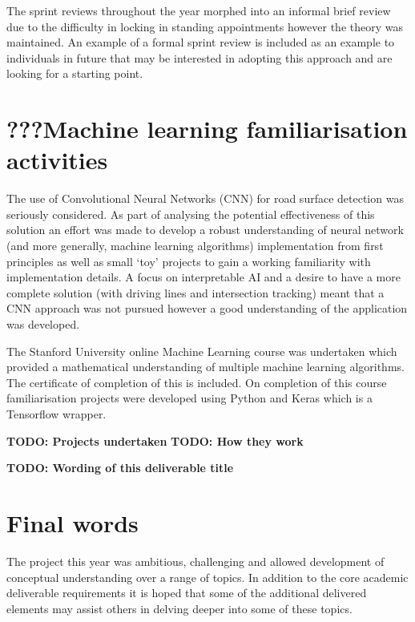 \documentclass{article}
\begin{document}
The sprint reviews throughout the year morphed into an informal brief review due to the difficulty in locking in standing appointments however the theory was maintained. An example of a formal sprint review is included as an example to individuals in future that may be interested in adopting this approach and are looking for a starting point.

\section{???Machine learning familiarisation activities}

The use of Convolutional Neural Networks (CNN) for road surface detection was seriously considered. As part of analysing the potential effectiveness of this solution an effort was made to develop a robust understanding of neural network (and more generally, machine learning algorithms) implementation from first principles as well as small `toy' projects to gain a working familiarity with implementation details. A focus on interpretable AI and a desire to have a more complete solution (with driving lines and intersection tracking) meant that a CNN approach was not pursued however a good understanding of the application was developed.

The Stanford University online Machine Learning course was undertaken which provided a mathematical understanding of multiple machine learning algorithms. The certificate of completion of this is included. On completion of this course familiarisation projects were developed using Python and Keras which is a Tensorflow wrapper. 

\textbf{TODO: Projects undertaken}
\textbf{TODO: How they work}



\textbf{TODO: Wording of this deliverable title}
\section*{Final words}
The project this year was ambitious, challenging and allowed development of conceptual understanding over a range of topics. In addition to the core academic deliverable requirements it is hoped that some of the additional delivered elements may assist others in delving deeper into some of these topics.


\end{document}
